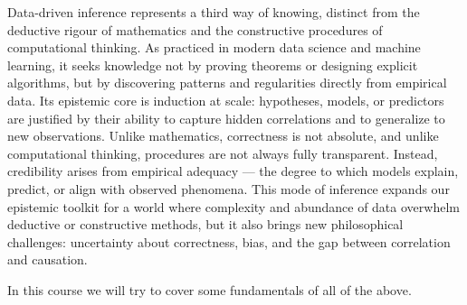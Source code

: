 Data-driven inference represents a third way of knowing, distinct from the deductive rigour of mathematics and the constructive procedures of computational thinking. As practiced in modern data science and machine learning, it seeks knowledge not by proving theorems or designing explicit algorithms, but by discovering patterns and regularities directly from empirical data. Its epistemic core is induction at scale: hypotheses, models, or predictors are justified by their ability to capture hidden correlations and to generalize to new observations. Unlike mathematics, correctness is not absolute, and unlike computational thinking, procedures are not always fully transparent. Instead, credibility arises from empirical adequacy — the degree to which models explain, predict, or align with observed phenomena. This mode of inference expands our epistemic toolkit for a world where complexity and abundance of data overwhelm deductive or constructive methods, but it also brings new philosophical challenges: uncertainty about correctness, bias, and the gap between correlation and causation.

In this course we will try to cover some fundamentals of all of the above.

